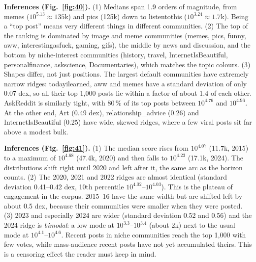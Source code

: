 
\textbf{Inferences (Fig.~\ref{fig:40}).}
(1) Medians span 1.9 orders of magnitude, from memes ($10^{5.13}\approx135$k) and pics (125k) down to listentothis
($10^{3.24}\approx1.7$k). Being a ``top post'' means very different things in different communities.
(2) The top of the ranking is dominated by image and meme communities (memes, pics, funny, aww, interestingasfuck, gaming,
gifs), the middle by news and discussion, and the bottom by niche-interest communities (history, travel,
InternetIsBeautiful, personalfinance, askscience, Documentaries), which matches the topic colours.
(3) Shapes differ, not just positions. The largest default communities have extremely narrow ridges: todayilearned, aww and
memes have a standard deviation of only 0.07 dex, so all their top 1,000 posts lie within a factor of about 1.4 of each
other. AskReddit is similarly tight, with 80\,\% of its top posts between $10^{4.76}$ and $10^{4.96}$. At the other end, Art
(0.49 dex), relationship\_advice (0.26) and InternetIsBeautiful (0.25) have wide, skewed ridges, where a few viral posts
sit far above a modest bulk.


\textbf{Inferences (Fig.~\ref{fig:41}).}
(1) The median score rises from $10^{4.07}$ (11.7k, 2015) to a maximum of $10^{4.68}$ (47.4k, 2020) and then falls to
$10^{4.23}$ (17.1k, 2024). The distributions shift right until 2020 and left after it, the same arc as the horizon
counts.
(2) The 2020, 2021 and 2022 ridges are almost identical (standard deviation 0.41--0.42 dex, 10th percentile
$10^{4.02}$--$10^{4.03}$). This is the plateau of engagement in the corpus. 2015--16 have the same width but are shifted
left by about 0.5 dex, because their communities were smaller when they were posted.
(3) 2023 and especially 2024 are wider (standard deviation 0.52 and 0.56) and the 2024 ridge is \emph{bimodal}: a low mode at
$10^{3.3}$--$10^{3.4}$ (about 2k) next to the usual mode at $10^{4.1}$--$10^{4.6}$. Recent posts in niche communities reach
the top 1,000 with few votes, while mass-audience recent posts have not yet accumulated theirs. This is a censoring effect
the reader must keep in mind.


